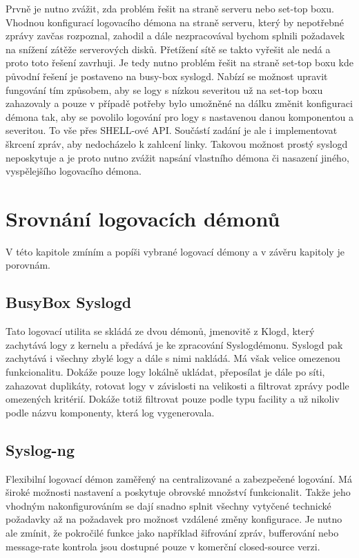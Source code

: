 \documentclass[thesis=B,czech]{FITthesis}[2012/06/26]
\begin{document}
Prvně je nutno zvážit, zda problém řešit na straně serveru nebo set-top boxu. Vhodnou konfigurací logovacího démona na straně serveru, který by nepotřebné zprávy zavčas rozpoznal, zahodil a dále nezpracovával bychom splnili požadavek na snížení zátěže serverových disků. Přetížení sítě se takto vyřešit ale nedá a proto toto řešení zavrhuji.
Je tedy nutno problém řešit na straně set-top boxu kde původní řešení je postaveno na busy-box syslogd. Nabízí se možnost upravit fungování tím způsobem, aby se logy s nízkou severitou už na set-top boxu zahazovaly a pouze v případě potřeby bylo umožněné na dálku změnit konfiguraci démona tak, aby se povolilo logování pro logy s nastavenou danou komponentou a severitou. To vše přes SHELL-ové API.
Součástí zadání je ale i implementovat škrcení zpráv, aby nedocházelo k zahlcení linky. Takovou možnost prostý syslogd neposkytuje a je proto nutno zvážit napsání vlastního démona či nasazení jiného, vyspělejšího logovacího démona.


\section{Srovnání logovacích démonů}
V této kapitole zmíním a popíši vybrané logovací démony a v závěru kapitoly je porovnám.

\subsection{BusyBox Syslogd}
Tato logovací utilita se skládá ze dvou démonů, jmenovitě z Klogd, který zachytává logy z kernelu a předává je ke zpracování Syslogdémonu. Syslogd pak zachytává i všechny zbylé logy a dále s nimi nakládá. Má však velice omezenou funkcionalitu. Dokáže pouze logy lokálně ukládat, přeposílat je dále po síti, zahazovat duplikáty, rotovat logy v závislosti na velikosti a filtrovat zprávy podle omezených kritérií. Dokáže totiž filtrovat pouze podle typu facility a už nikoliv podle názvu komponenty, která log vygenerovala.

\subsection{Syslog-ng}
Flexibilní logovací démon zaměřený na centralizované a zabezpečené logování. Má široké možnosti nastavení a poskytuje obrovské množství funkcionalit. Takže jeho vhodným nakonfigurováním se dají snadno splnit všechny vytyčené technické požadavky až na požadavek pro možnost vzdálené změny konfigurace.
Je nutno ale zmínit, že pokročilé funkce jako například šifrování zpráv, bufferování nebo message-rate kontrola jsou dostupné pouze v komerční closed-source verzi.
\end{document}
